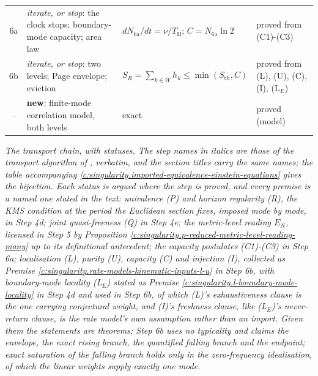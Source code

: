 \documentclass[11pt]{article}
\theoremstyle{definition}
\theoremstyle{plain}
\providecommand{\EN}{}\renewcommand{\EN}{E_{N}}
\providecommand{\Sth}{}\renewcommand{\Sth}{S_{\mathrm{th}}}
\providecommand{\TH}{}\renewcommand{\TH}{T_{\mathrm{H}}}
\begin{document}
\begin{tabular}{c>{ \arraybackslash}p{4.7cm}>{ \arraybackslash}p{4.6cm}l}
6a & \emph{iterate, or stop}: the clock stops; boundary-mode capacity; area law & $dN_{\mathrm{6a}}/dt = \nu/\TH$; $C = N_{\mathrm{6a}}\ln 2$ & proved from (C1)-(C3) \\
6b & \emph{iterate, or stop}: two levels; Page envelope; eviction & $S_R = \sum_{k \in W} h_k \leq \min(\Sth, C)$ & proved from (L), (U), (C), (I), (L$_E$) \\
\midrule
-- & \textbf{new}: finite-mode correlation model, both levels & exact & proved (model) \\
\bottomrule
\end{tabular}

\emph{The transport chain, with statuses. The step names in italics are those of the transport algorithm of \cite[\S 8.1]{ButlerT1}, verbatim, and the section titles carry the same names; the table accompanying \ref{c:singularity.imported-equivalence-einstein-equations} gives the bijection. Each status is argued where the step is proved, and every premise is a named one stated in the text: univalence (P) and horizon regularity (R), the KMS condition at the period the Euclidean section fixes, imposed mode by mode, in Step 4d; joint quasi-freeness (Q) in Step 4e; the metric-level reading $\EN$, licensed in Step 5 by Proposition \ref{c:singularity.p-reduced-metric-level-reading-many} up to its definitional antecedent; the capacity postulates (C1)-(C3) in Step 6a; localisation (L), purity (U), capacity (C) and injection (I), collected as Premise \ref{c:singularity.rate-models-kinematic-inputs-l-u} in Step 6b, with boundary-mode locality (L$_E$) stated as Premise \ref{c:singularity.l-boundary-mode-locality} in Step 4d and used in Step 6b, of which (L)'s exhaustiveness clause is the one carrying conjectural weight, and (I)'s freshness clause, like (L$_E$)'s never-return clause, is the rate model's own assumption rather than an import. Given them the statements are theorems; Step 6b uses no typicality and claims the envelope, the exact rising branch, the quantified falling branch and the endpoint; exact saturation of the falling branch holds only in the zero-frequency idealisation, of which the linear weights supply exactly one mode.}
\end{document}

